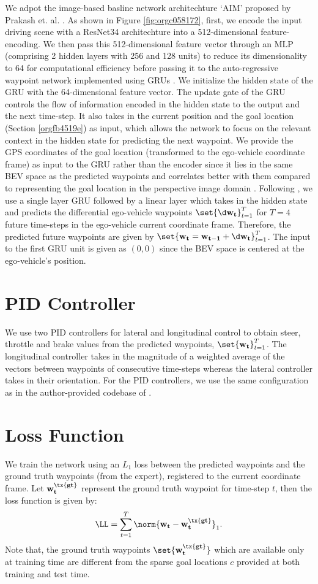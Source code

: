 \documentclass[letterpaper, 12pt]{book}
\theoremstyle{definition}
\theoremstyle{definition}
\theoremstyle{definition}
\theoremstyle{definition}
\theoremstyle{definition}
\begin{document}
We adpot the image-based basline network architechture `AIM' proposed by Prakash
et. al. \cite{Prakash2021}.  As shown in Figure \ref{fig:orgc058172}, first, we encode the input
driving scene with a ResNet34 architechture into a 512-dimensional
feature-encoding. We then pass this 512-dimensional feature vector through an
MLP (comprising 2 hidden layers with 256 and 128 units) to reduce its
dimensionality to 64 for computational efficiency before passing it to the
auto-regressive waypoint network implemented using GRUs \cite{Cho2014}. We
initialize the hidden state of the GRU with the 64-dimensional feature
vector. The update gate of the GRU controls the flow of information encoded in
the hidden state to the output and the next time-step. It also takes in the
current position and the goal location (Section \ref{orgfb4519e}) as input, which allows the
network to focus on the relevant context in the hidden state for predicting the
next waypoint.  We provide the GPS coordinates of the goal location (transformed
to the ego-vehicle coordinate frame) as input to the GRU rather than the encoder
since it lies in the same BEV space as the predicted waypoints and correlates
better with them compared to representing the goal location in the perspective
image domain \cite{Chen2019}. Following \cite{Filos2020}, we use a single layer
GRU followed by a linear layer which takes in the hidden state and predicts the
differential ego-vehicle waypoints \(\set{\d \bf w_{t}}_{t=1}^{T}\) for \(T=4\)
future time-steps in the ego-vehicle current coordinate frame. Therefore, the
predicted future waypoints are given by \(\set{\bf w_{t}=\bf w_{t-1} +\d \bf
w_{t}}_{t=1}^{T}\). The input to the first GRU unit is given as \((0,0)\) since
the BEV space is centered at the ego-vehicle’s position.

\section{PID Controller}
\label{sec:org9350ba8}
We use two PID controllers for lateral and longitudinal control to obtain steer,
throttle and brake values from the predicted waypoints, \(\set{\bf
w_{t}}_{t=1}^{T}\). The longitudinal controller takes in the magnitude of a
weighted average of the vectors between waypoints of consecutive time-steps
whereas the lateral controller takes in their orientation. For the PID
controllers, we use the same configuration as in the author-provided codebase of
\cite{Chen2019}.
\section{Loss Function \label{orgd8eb7f8}}
\label{sec:orgf088d9a}
We train the network using an \(L_{1}\) loss between the predicted waypoints and
the ground truth waypoints (from the expert), registered to the current
coordinate frame. Let \(\bf w_{t}^{\tx{gt}}\) represent the ground truth
waypoint for time-step \(t\), then the loss function is given by:
\[\LL=\sum_{t=1}^{T}\norm{\bf w_{t}-\bf w_{t}^{\tx{gt}}}_{1}.\] Note that, the
ground truth waypoints \(\set{\bf w_{t}^{\tx{gt}}}\) which are available only at
training time are different from the sparse goal locations \(c\) provided at
both training and test time.
\end{document}
